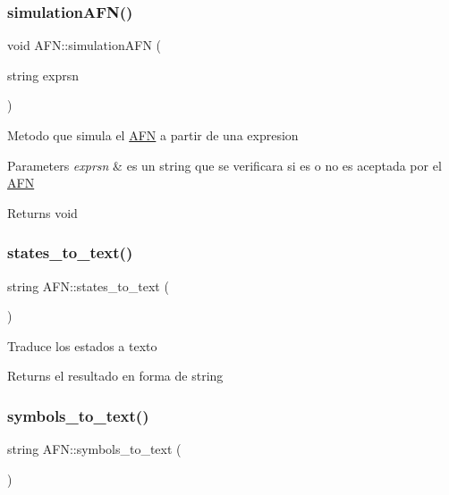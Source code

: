 \subsubsection{\texorpdfstring{simulation\+A\+F\+N()}{simulationAFN()}}
{\footnotesize\ttfamily void A\+F\+N\+::simulation\+A\+FN (\begin{DoxyParamCaption}\item[{string}]{exprsn }\end{DoxyParamCaption})}

Metodo que simula el \hyperlink{class_a_f_n}{A\+FN} a partir de una expresion 
\begin{DoxyParams}{Parameters}
{\em exprsn} & es un string que se verificara si es o no es aceptada por el \hyperlink{class_a_f_n}{A\+FN} \\
\hline
\end{DoxyParams}
\begin{DoxyReturn}{Returns}
void 
\end{DoxyReturn}
\hypertarget{class_a_f_n_a9fa600cf3140a16c766852901f8ace87}{}\label{class_a_f_n_a9fa600cf3140a16c766852901f8ace87} 
\subsubsection{\texorpdfstring{states\+\_\+to\+\_\+text()}{states\_to\_text()}}
{\footnotesize\ttfamily string A\+F\+N\+::states\+\_\+to\+\_\+text (\begin{DoxyParamCaption}{ }\end{DoxyParamCaption})}

Traduce los estados a texto \begin{DoxyReturn}{Returns}
el resultado en forma de string 
\end{DoxyReturn}
\hypertarget{class_a_f_n_a6c3604cb78a40bbbc05e79c8c2d783e0}{}\label{class_a_f_n_a6c3604cb78a40bbbc05e79c8c2d783e0} 
\subsubsection{\texorpdfstring{symbols\+\_\+to\+\_\+text()}{symbols\_to\_text()}}
{\footnotesize\ttfamily string A\+F\+N\+::symbols\+\_\+to\+\_\+text (\begin{DoxyParamCaption}{ }\end{DoxyParamCaption})}

